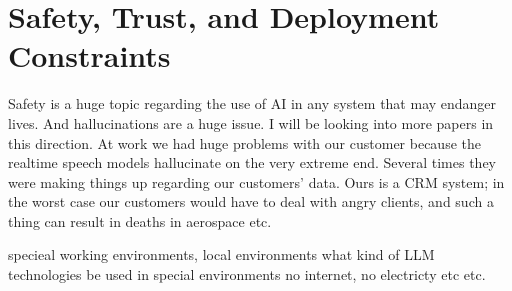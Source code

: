 \section{Safety, Trust, and Deployment Constraints}
\label{sec:safety}

Safety is a huge topic regarding the use of AI in any system that may endanger lives.
And hallucinations are a huge issue. I will be looking into more papers in this direction.
At work we had huge problems with our customer because the realtime speech models hallucinate on the very extreme end.
Several times they were making things up regarding our customers’ data.
Ours is a CRM system; in the worst case our customers would have to deal with angry clients,
and such a thing can result in deaths in aerospace etc.

specieal working environments, local environments what kind of LLM technologies be used in special environments no internet, no electricty etc etc.